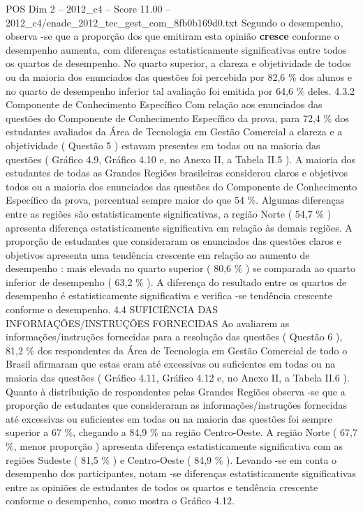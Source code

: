 \begin{textsample}{POS Dim 2 – 2012\_c4 – Score 11.00 – 2012\_c4/enade\_2012\_tec\_gest\_com\_8fb0b169d0.txt}
Segundo o desempenho, observa -se que a proporção dos que emitiram esta opinião \textbf{cresce} conforme o desempenho aumenta, com diferenças estatisticamente significativas entre todos os quartos de desempenho.
No quarto superior, a clareza e objetividade de todos ou da maioria dos enunciados das questões foi percebida por 82,6 \% dos alunos e no quarto de desempenho inferior tal avaliação foi emitida por 64,6 \% deles. 4.3.2 Componente de Conhecimento Específico Com relação aos enunciados das questões do Componente de Conhecimento Específico da prova, para 72,4 \% dos estudantes avaliados da Área de Tecnologia em Gestão Comercial a clareza e a objetividade ( Questão 5 ) estavam presentes em todas ou na maioria das questões ( Gráfico 4.9, Gráfico 4.10 e, no Anexo II, a Tabela II.5 ).
A maioria dos estudantes de todas as Grandes Regiões brasileiras considerou claros e objetivos todos ou a maioria dos enunciados das questões do Componente de Conhecimento Específico da prova, percentual sempre maior do que 54 \%.
Algumas diferenças entre as regiões são estatisticamente significativas, a região Norte ( 54,7 \% ) apresenta diferença estatisticamente significativa em relação às demais regiões.
A proporção de estudantes que consideraram os enunciados das questões claros e objetivos apresenta uma tendência crescente em relação ao aumento de desempenho : mais elevada no quarto superior ( 80,6 \% ) se comparada ao quarto inferior de desempenho ( 63,2 \% ).
A diferença do resultado entre os quartos de desempenho é estatisticamente significativa e verifica -se tendência crescente conforme o desempenho. 4.4 SUFICIÊNCIA DAS INFORMAÇÕES/INSTRUÇÕES FORNECIDAS Ao avaliarem as informações/instruções fornecidas para a resolução das questões ( Questão 6 ), 81,2 \% dos respondentes da Área de Tecnologia em Gestão Comercial de todo o Brasil afirmaram que estas eram até excessivas ou suficientes em todas ou na maioria das questões ( Gráfico 4.11, Gráfico 4.12 e, no Anexo II, a Tabela II.6 ).
Quanto à distribuição de respondentes pelas Grandes Regiões observa -se que a proporção de estudantes que consideraram as informações/instruções fornecidas até excessivas ou suficientes em todas ou na maioria das questões foi sempre superior a 67 \%, chegando a 84,9 \% na região Centro-Oeste.
A região Norte ( 67,7 \%, menor proporção ) apresenta diferença estatisticamente significativa com as regiões Sudeste ( 81,5 \% ) e Centro-Oeste ( 84,9 \% ).
Levando -se em conta o desempenho dos participantes, notam -se diferenças estatisticamente significativas entre as opiniões de estudantes de todos os quartos e tendência crescente conforme o desempenho, como mostra o Gráfico 4.12.

\end{textsample}
